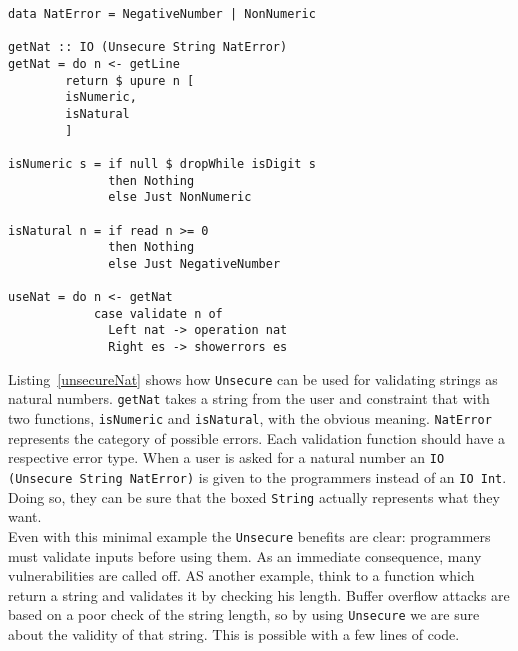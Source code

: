 \begin{lstlisting}[label={unsecureNat}, breaklines=true, caption={Unsecure for natural numbers}]
data NatError = NegativeNumber | NonNumeric

getNat :: IO (Unsecure String NatError)
getNat = do n <- getLine
	    return $ upure n [
		isNumeric,
		isNatural
	    ]	   
	    
isNumeric s = if null $ dropWhile isDigit s
              then Nothing
              else Just NonNumeric

isNatural n = if read n >= 0
              then Nothing
              else Just NegativeNumber
              
useNat = do n <- getNat
            case validate n of
              Left nat -> operation nat
              Right es -> showerrors es
\end{lstlisting}
Listing~\ref{unsecureNat} shows how \texttt{Unsecure} can be used for validating strings as natural numbers. \texttt{getNat} takes a string from the user and constraint that with two functions, \texttt{isNumeric} and \texttt{isNatural}, with the obvious meaning. \texttt{NatError} represents the category of possible errors. Each validation function should have a respective error type. When a user is asked for a natural number an \texttt{IO (Unsecure String NatError)} is given to the programmers instead of an \texttt{IO Int}. Doing so, they can be sure that the boxed \texttt{String} actually represents what they want. \\
Even with this minimal example the \texttt{Unsecure} benefits are clear: programmers must validate inputs before using them. As an immediate consequence, many vulnerabilities are called off. AS another example, think to a function which return a string and validates it by checking his length. Buffer overflow attacks are based on a poor check of the string length, so by using \texttt{Unsecure} we are sure about the validity of that string. This is possible with a few lines of code. 